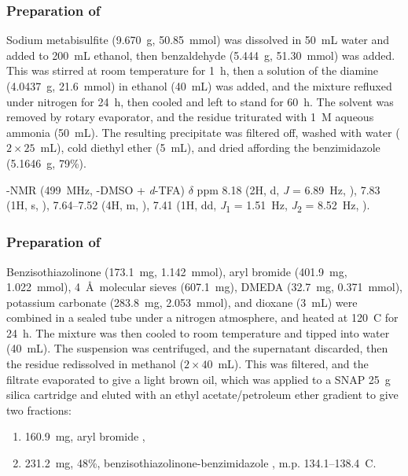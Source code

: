 \begin{refsection}
\subsubsection{Preparation of }
Sodium metabisulfite (9.670~g, 50.85~mmol) was dissolved in 50~mL water and added to 200~mL ethanol, then benzaldehyde (5.444~g, 51.30~mmol) was added.
This was stirred at room temperature for 1~h, then a solution of the diamine  (4.0437~g, 21.6~mmol) in ethanol (40~mL) was added, and the mixture refluxed under nitrogen for 24~h, then cooled and left to stand for 60~h.
The solvent was removed by rotary evaporator, and the residue triturated with 1~M aqueous ammonia (50~mL). 
The resulting precipitate was filtered off, washed with water ($2\times25$~mL), cold diethyl ether (5~mL), and dried affording the benzimidazole  (5.1646~g, 79\%).\autocite{Kim2011}

-NMR (499~MHz, -DMSO + \textit{d}-TFA) $\delta$ ppm 
8.18 (2H, d, \textit{J} = 6.89~Hz, ), 
7.83 (1H, s, ), 
7.64--7.52 (4H, m, ), 
7.41 (1H, dd, \textit{J}\textsubscript{1} = 1.51~Hz, \textit{J}\textsubscript{2} = 8.52~Hz, ).%

\subsubsection{Preparation of }
Benzisothiazolinone  (173.1~mg, 1.142~mmol), aryl bromide  (401.9~mg, 1.022~mmol), 4~\AA\ molecular sieves (607.1~mg), DMEDA (32.7~mg, 0.371~mmol), potassium carbonate (283.8~mg, 2.053~mmol), and dioxane (3~mL) were combined in a sealed tube under a nitrogen atmosphere, and heated at 120~\degree{}C for 24~h.
The mixture was then cooled to room temperature and tipped into water (40~mL).
The suspension was centrifuged, and the supernatant discarded, then the residue redissolved in methanol ($2\times40$~mL).
This was filtered, and the filtrate evaporated to give a light brown oil, which was applied to a SNAP 25~g silica cartridge and eluted with an ethyl acetate/petroleum ether gradient to give two fractions:
\begin{enumerate}
    \item 160.9~mg, aryl bromide ,
    \item 231.2~mg, 48\%, benzisothiazolinone-benzimidazole , m.p. 134.1--138.4~\degree{}C.
\end{enumerate}


\end{refsection}
